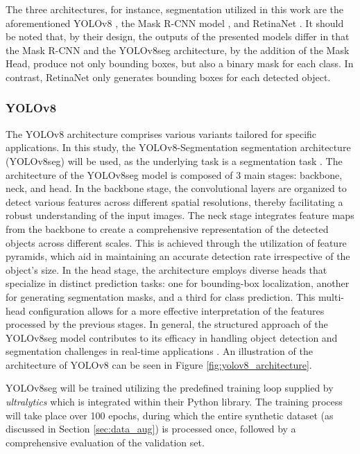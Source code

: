 \documentclass[draft,final]{vutinfth} %
\begin{document}
The three architectures, for instance, segmentation utilized in this work are the aforementioned YOLOv8 \cite{yao_hp-yolov8_2024}, the Mask R-CNN model \cite{he_mask_2018}, and RetinaNet \cite{lin_focal_2018}. 
It should be noted that, by their design, the outputs of the presented models differ in that the Mask R-CNN and the YOLOv8seg architecture, by the addition of the Mask Head, produce not only bounding boxes, but also a binary mask for each class. In contrast, RetinaNet only generates bounding boxes for each detected object.

\subsubsection{YOLOv8} \label{sec:yolo_arch}
The YOLOv8 architecture comprises various variants tailored for specific applications. In this study, the YOLOv8-Segmentation segmentation architecture (YOLOv8seg) will be used, as the underlying task is a segmentation task \cite{jocher_ultralytics_2023}.
The architecture of the YOLOv8seg model is composed of 3 main stages: backbone, neck, and head. In the backbone stage, the convolutional layers are organized to detect various features across different spatial resolutions, thereby facilitating a robust understanding of the input images. The neck stage integrates feature maps from the backbone to create a comprehensive representation of the detected objects across different scales. This is achieved through the utilization of feature pyramids, which aid in maintaining an accurate detection rate irrespective of the object's size. In the head stage, the architecture employs diverse heads that specialize in distinct prediction tasks: one for bounding-box localization, another for generating segmentation masks, and a third for class prediction. This multi-head configuration allows for a more effective interpretation of the features processed by the previous stages. In general, the structured approach of the YOLOv8seg model contributes to its efficacy in handling object detection and segmentation challenges in real-time applications \cite{pedro_detailed_2023, timilsina_yolov8_2024}. An illustration of the architecture of YOLOv8 can be seen in Figure \ref{fig:yolov8_architecture}.

YOLOv8seg will be trained utilizing the predefined training loop supplied by \textit{ultralytics} which is integrated within their Python library. The training process will take place over 100 epochs, during which the entire synthetic dataset (as discussed in Section \ref{sec:data_aug}) is processed once, followed by a comprehensive evaluation of the validation set. 
\end{document}
